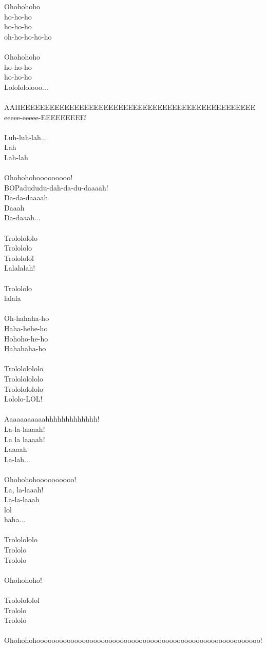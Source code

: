 Ohohohoho\\
ho-ho-ho\\
ho-ho-ho\\
oh-ho-ho-ho-ho\\
\\
Ohohohoho\\
ho-ho-ho\\
ho-ho-ho\\
Lololololooo...\\
\\
AAIIEEEEEEEEEEEEEEEEEEEEEEEEEEEEEEEEEEEEEEEEEEEEEEEE\\
eeeee-eeeee-EEEEEEEEE!\\
\\
Luh-luh-lah...\\
Lah\\
Lah-lah\\
\\
Ohohohohooooooooo!\\
BOPadududu-dah-da-du-daaaah!\\
Da-da-daaaah\\
Daaah\\
Da-daaah...\\
\\
Trololololo\\
Trolololo\\
Trolololol\\
Lalalalah!\\
\\
Trolololo\\
lalala\\
\\
Oh-hahaha-ho\\
Haha-hehe-ho\\
Hohoho-he-ho\\
Hahahaha-ho\\
\\
Trolololololo\\
Trolololololo\\
Trolololololo\\
Lololo-LOL!\\
\\
Aaaaaaaaaaahhhhhhhhhhhhh!\\
La-la-laaaah!\\
La la laaaah!\\
Laaaah\\
La-lah...\\
\\
Ohohohohoooooooooo!\\
La, la-laaah!\\
La-la-laaah\\
lol\\
haha...\\
\\
Trololololo\\
Trololo\\
Trololo\\
\\
Ohohohoho!\\
\\
Trololololol\\
Trololo\\
Trololo\\
\\
Ohohohohooooooooooooooooooooooooooooooooooooooooooooooooooooooooooo!
